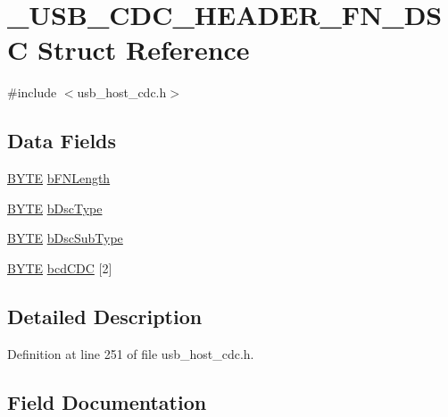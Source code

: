\hypertarget{struct___u_s_b___c_d_c___h_e_a_d_e_r___f_n___d_s_c}{}\section{\+\_\+\+U\+S\+B\+\_\+\+C\+D\+C\+\_\+\+H\+E\+A\+D\+E\+R\+\_\+\+F\+N\+\_\+\+D\+S\+C Struct Reference}
\label{struct___u_s_b___c_d_c___h_e_a_d_e_r___f_n___d_s_c}


{\ttfamily \#include $<$usb\+\_\+host\+\_\+cdc.\+h$>$}

\subsection*{Data Fields}
\begin{DoxyCompactItemize}
\item 
\hyperlink{_generic_type_defs_8h_a4ae1dab0fb4b072a66584546209e7d58}{B\+Y\+T\+E} \hyperlink{struct___u_s_b___c_d_c___h_e_a_d_e_r___f_n___d_s_c_a5cba7e463fbde92bb6daf4547a127a28}{b\+F\+N\+Length}
\item 
\hyperlink{_generic_type_defs_8h_a4ae1dab0fb4b072a66584546209e7d58}{B\+Y\+T\+E} \hyperlink{struct___u_s_b___c_d_c___h_e_a_d_e_r___f_n___d_s_c_a3641ecfd04e86c3ce95c6bed0c066a5d}{b\+Dsc\+Type}
\item 
\hyperlink{_generic_type_defs_8h_a4ae1dab0fb4b072a66584546209e7d58}{B\+Y\+T\+E} \hyperlink{struct___u_s_b___c_d_c___h_e_a_d_e_r___f_n___d_s_c_ac65bb2d41adfb877a46a2c45d2a1cb72}{b\+Dsc\+Sub\+Type}
\item 
\hyperlink{_generic_type_defs_8h_a4ae1dab0fb4b072a66584546209e7d58}{B\+Y\+T\+E} \hyperlink{struct___u_s_b___c_d_c___h_e_a_d_e_r___f_n___d_s_c_a6fe2a11dc183bdca2fff4043dc9f148e}{bcd\+C\+D\+C} \mbox{[}2\mbox{]}
\end{DoxyCompactItemize}


\subsection{Detailed Description}


Definition at line 251 of file usb\+\_\+host\+\_\+cdc.\+h.



\subsection{Field Documentation}
\hypertarget{struct___u_s_b___c_d_c___h_e_a_d_e_r___f_n___d_s_c_a6fe2a11dc183bdca2fff4043dc9f148e}{}
